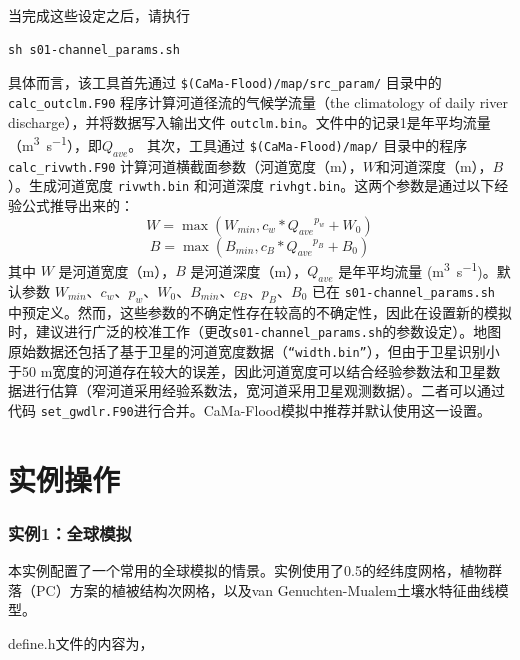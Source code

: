 \documentclass[a4paper,12pt,twoside]{article}
\begin{document}
\begin{enumerate}
当完成这些设定之后，请执行 
\begin{lstlisting}
sh s01-channel_params.sh
\end{lstlisting}
具体而言，该工具首先通过 \texttt{\$(CaMa-Flood)/map/src\_param/} 目录中的 \texttt{calc\allowbreak\_outclm\allowbreak.F90} 程序计算河道径流的气候学流量（the climatology of daily river discharge），并将数据写入输出文件 \texttt{outclm.bin}。文件中的记录1是年平均流量（\unit{m^3.s^{-1}}），即$Q_{ave}$。 其次，工具通过 \texttt{\$(CaMa-Flood)/map/} 目录中的程序 \texttt{calc\_rivwth.F90} 计算河道横截面参数（河道宽度（m），$W$和河道深度（m），$B$）。生成河道宽度 \texttt{rivwth.bin} 和河道深度 \texttt{rivhgt.bin}。这两个参数是通过以下经验公式推导出来的：
\begin{equation}
W=\max(W_{min},c_w\ast{Q_{ave}}^{p_w}+W_0)
\end{equation}
\begin{equation}
B=\max(B_{min},c_B\ast{Q_{ave}}^{p_B}+B_0)
\end{equation}
其中 $W$ 是河道宽度（m），$B$ 是河道深度（m），$Q_{ave}$ 是年平均流量 (\unit{m^3.s^{-1}})。默认参数 $W_{min}$、$c_w$、$p_w$、$W_0$、$B_{min}$、$c_B$、$p_B$、$B_0$ 已在 \texttt{s01-channel\_params.sh} 中预定义。然而，这些参数的不确定性存在较高的不确定性，因此在设置新的模拟时，建议进行广泛的校准工作（更改\texttt{s01-channel\_params.sh}的参数设定）。地图原始数据还包括了基于卫星的河道宽度数据（\texttt{“width.bin”}），但由于卫星识别小于50 m宽度的河道存在较大的误差，因此河道宽度可以结合经验参数法和卫星数据进行估算（窄河道采用经验系数法，宽河道采用卫星观测数据）。二者可以通过代码 \texttt{set\_gwdlr.F90}进行合并。CaMa-Flood模拟中推荐并默认使用这一设置。
 

\end{enumerate}

\clearpage

\part{实例操作}

\section{实例1：全球模拟}

本实例配置了一个常用的全球模拟的情景。实例使用了0.5\textdegree 的经纬度网格，植物群落（PC）方案的植被结构次网格，以及van Genuchten-Mualem土壤水特征曲线模型。

define.h文件的内容为，

\end{document}
